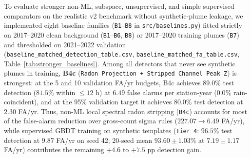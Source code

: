 \documentclass[11pt,a4paper]{article}
\begin{document}
\begin{framed}
To evaluate stronger non-ML, subspace, unsupervised, and simple supervised comparators on the realistic v2 benchmark without synthetic-plume leakage, we implemented eight baseline families (\texttt{B1}--\texttt{B8} in \texttt{src/baselines.py}) fitted strictly on 2017--2020 clean background (\texttt{B1}--\texttt{B6}, \texttt{B8}) or 2017--2020 training plumes (\texttt{B7}) and thresholded on 2021--2022 validation (\texttt{baseline\_matched\_detection\_table.csv}, \texttt{baseline\_matched\_fa\_table.csv}, Table~\ref{tab:stronger_baselines}). Among all detectors that never see synthetic plumes in training, \textbf{B4c} (\texttt{Radon Projection + Stripped Channel Peak Z}) is strongest: at the 5 and 10 validation FA/yr budgets, B4c achieves $89.0\%$ test detection ($81.5\%$ within $\le 12\text{ h}$) at $6.49$ false alarms per station-year ($0.0\%$ rain-coincident), and at the 95\% validation target it achieves $80.0\%$ test detection at $2.30$ FA/yr. Thus, non-ML local spectral radon stripping (\texttt{B4c}) accounts for most of the false-alarm reduction over gross-count sigma rules ($227.07 \to 6.49$ FA/yr), while supervised GBDT training on synthetic templates (\texttt{Tier 4}: $96.5\%$ test detection at $9.87$ FA/yr on seed 42; 20-seed mean $93.60 \pm 1.03\%$ at $7.19 \pm 1.17$ FA/yr) contributes the remaining $+4.6$ to $+7.5\text{ pp}$ detection gain.


\end{framed}
\end{document}
